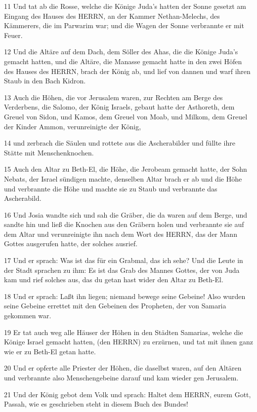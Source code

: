 \par 11 Und tat ab die Rosse, welche die Könige Juda's hatten der Sonne gesetzt am Eingang des Hauses des HERRN, an der Kammer Nethan-Melechs, des Kämmerers, die im Parwarim war; und die Wagen der Sonne verbrannte er mit Feuer.
\par 12 Und die Altäre auf dem Dach, dem Söller des Ahas, die die Könige Juda's gemacht hatten, und die Altäre, die Manasse gemacht hatte in den zwei Höfen des Hauses des HERRN, brach der König ab, und lief von dannen und warf ihren Staub in den Bach Kidron.
\par 13 Auch die Höhen, die vor Jerusalem waren, zur Rechten am Berge des Verderbens, die Salomo, der König Israels, gebaut hatte der Asthoreth, dem Greuel von Sidon, und Kamos, dem Greuel von Moab, und Milkom, dem Greuel der Kinder Ammon, verunreinigte der König,
\par 14 und zerbrach die Säulen und rottete aus die Ascherabilder und füllte ihre Stätte mit Menschenknochen.
\par 15 Auch den Altar zu Beth-El, die Höhe, die Jerobeam gemacht hatte, der Sohn Nebats, der Israel sündigen machte, denselben Altar brach er ab und die Höhe und verbrannte die Höhe und machte sie zu Staub und verbrannte das Ascherabild.
\par 16 Und Josia wandte sich und sah die Gräber, die da waren auf dem Berge, und sandte hin und ließ die Knochen aus den Gräbern holen und verbrannte sie auf dem Altar und verunreinigte ihn nach dem Wort des HERRN, das der Mann Gottes ausgerufen hatte, der solches ausrief.
\par 17 Und er sprach: Was ist das für ein Grabmal, das ich sehe? Und die Leute in der Stadt sprachen zu ihm: Es ist das Grab des Mannes Gottes, der von Juda kam und rief solches aus, das du getan hast wider den Altar zu Beth-El.
\par 18 Und er sprach: Laßt ihn liegen; niemand bewege seine Gebeine! Also wurden seine Gebeine errettet mit den Gebeinen des Propheten, der von Samaria gekommen war.
\par 19 Er tat auch weg alle Häuser der Höhen in den Städten Samarias, welche die Könige Israel gemacht hatten, (den HERRN) zu erzürnen, und tat mit ihnen ganz wie er zu Beth-El getan hatte.
\par 20 Und er opferte alle Priester der Höhen, die daselbst waren, auf den Altären und verbrannte also Menschengebeine darauf und kam wieder gen Jerusalem.
\par 21 Und der König gebot dem Volk und sprach: Haltet dem HERRN, eurem Gott, Passah, wie es geschrieben steht in diesem Buch des Bundes!
